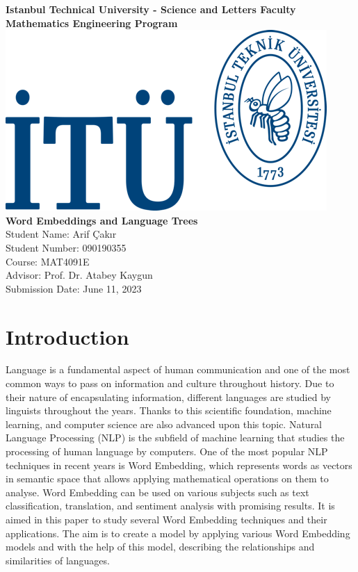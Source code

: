 \documentclass[man]{apa7}
\begin{document}
\begin{titlepage}
\centering
{\large \textbf{ Istanbul Technical University - Science and Letters Faculty}}\\
{\large \textbf{Mathematics Engineering Program}}\\[4\baselineskip]
\includegraphics[scale = 1.5]{itülogo.png}\\[6\baselineskip]
{\LARGE \textbf{Word Embeddings and Language Trees}}\\[2\baselineskip]

{\Large Student Name: Arif Çakır}\\
{\large Student Number: 090190355}\\
{\large Course: MAT4091E}\\
{\large Advisor: Prof. Dr. Atabey Kaygun}\\
{\large Submission Date: June 11, 2023}\\
\end{titlepage}
\tableofcontents
\pagebreak

\section{Introduction}
Language is a fundamental aspect of human communication and one of the most common ways to pass on information and culture throughout history. Due to their nature of encapsulating information, different languages are studied by linguists throughout the years. Thanks to this scientific foundation, machine learning, and computer science are also advanced upon this topic. Natural Language Processing (NLP) is the subfield of machine learning that studies the processing of human language by computers. One of the most popular NLP techniques in recent years is Word Embedding, which represents words as vectors in semantic space that allows applying mathematical operations on them to analyse. Word Embedding can be used on various subjects such as text classification, translation, and sentiment analysis with promising results. It is aimed in this paper to study several Word Embedding techniques and their applications. The aim is to create a model by applying various Word Embedding models and with the help of this model, describing the relationships and similarities of languages.
\end{document}
